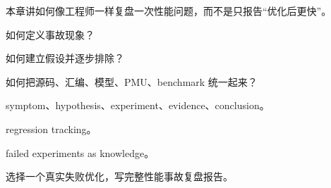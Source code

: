 {本章讲如何像工程师一样复盘一次性能问题，而不是只报告“优化后更快”。}
{\item 如何定义事故现象？
\item 如何建立假设并逐步排除？
\item 如何把源码、汇编、模型、PMU、benchmark 统一起来？}
{\item symptom、hypothesis、experiment、evidence、conclusion。
\item regression tracking。
\item failed experiments as knowledge。}
{选择一个真实失败优化，写完整性能事故复盘报告。}
